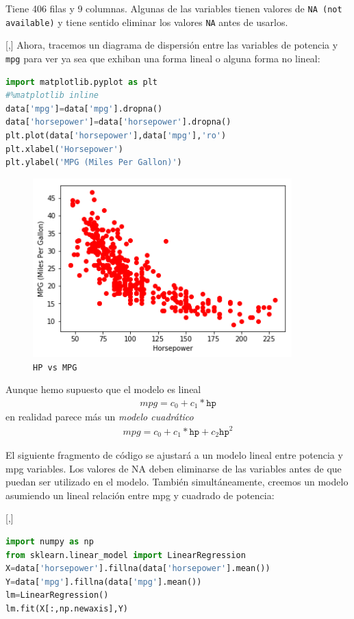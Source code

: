 Tiene 406 filas y 9 columnas. Algunas de las variables tienen valores de \texttt{NA (not available)} y tiene sentido eliminar los valores \texttt{NA} antes de usarlos.

[,]{}
Ahora, tracemos un diagrama de dispersión entre las variables de potencia y \texttt{mpg} para ver
ya sea que exhiban una forma lineal o alguna forma no lineal:
\begin{lstlisting}[language=Python]
import matplotlib.pyplot as plt
#%matplotlib inline
data['mpg']=data['mpg'].dropna()
data['horsepower']=data['horsepower'].dropna()
plt.plot(data['horsepower'],data['mpg'],'ro')
plt.xlabel('Horsepower')
plt.ylabel('MPG (Miles Per Gallon)')
\end{lstlisting}


\begin{figure}[h]
 \centering
 \includegraphics[width=10cm,keepaspectratio=true]{./images/hpVsMpg.png}
 \caption{\texttt{HP vs MPG}}
 \label{fig:hp}
\end{figure}


Aunque hemo supuesto que el modelo es lineal
\begin{align}
 mpg = c_{0} + c_{1}*\texttt{hp}
\end{align}
en realidad parece más un \emph{modelo cuadrático}
\begin{align}
 mpg = c_{0} + c_{1}*\texttt{hp} + c_{2}\texttt{hp}^{2}
\end{align}


El siguiente fragmento de código se ajustará a un modelo lineal entre potencia y mpg
variables. Los valores de NA deben eliminarse de las variables antes de que puedan
ser utilizado en el modelo. También simultáneamente, creemos un modelo asumiendo un lineal
relación entre mpg y cuadrado de potencia:

[,]{}
\begin{lstlisting}[language=Python]
import numpy as np
from sklearn.linear_model import LinearRegression
X=data['horsepower'].fillna(data['horsepower'].mean())
Y=data['mpg'].fillna(data['mpg'].mean())
lm=LinearRegression()
lm.fit(X[:,np.newaxis],Y)
\end{lstlisting}


